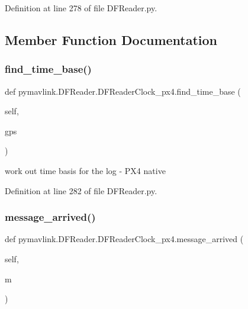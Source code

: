 Definition at line 278 of file D\+F\+Reader.\+py.



\subsection{Member Function Documentation}
\mbox{\label{classpymavlink_1_1DFReader_1_1DFReaderClock__px4_a7c7fbdf0097f50a76ebc096626a7be93}} 
\subsubsection{\texorpdfstring{find\_time\_base()}{find\_time\_base()}}
{\footnotesize\ttfamily def pymavlink.\+D\+F\+Reader.\+D\+F\+Reader\+Clock\+\_\+px4.\+find\+\_\+time\+\_\+base (\begin{DoxyParamCaption}\item[{}]{self,  }\item[{}]{gps }\end{DoxyParamCaption})}

\begin{DoxyVerb}work out time basis for the log - PX4 native\end{DoxyVerb}
 

Definition at line 282 of file D\+F\+Reader.\+py.

\mbox{\label{classpymavlink_1_1DFReader_1_1DFReaderClock__px4_a8579ed60c84cf8ff01bce19e716a434f}} 
\subsubsection{\texorpdfstring{message\_arrived()}{message\_arrived()}}
{\footnotesize\ttfamily def pymavlink.\+D\+F\+Reader.\+D\+F\+Reader\+Clock\+\_\+px4.\+message\+\_\+arrived (\begin{DoxyParamCaption}\item[{}]{self,  }\item[{}]{m }\end{DoxyParamCaption})}



